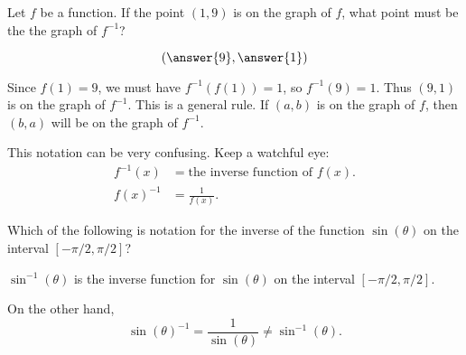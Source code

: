 \documentclass{ximera}
\begin{document}
\begin{question}
  Let $f$ be a function.  If the point $(1,9)$ is on the graph of $f$,
  what point must be the the graph of $f^{-1}$?
  \begin{prompt}
  \[
  \left( \answer{9}, \answer{1} \right)
  \]
  \end{prompt}
  \begin{feedback}
    Since $f(1) = 9$, we must have $f^{-1}(f(1)) = 1$, so $f^{-1}(9) =
    1$.  Thus $(9,1)$ is on the graph of $f^{-1}$.  This is a general
    rule.  If $(a,b)$ is on the graph of $f$, then $(b,a)$ will be on the
    graph of $f^{-1}$.
  \end{feedback}
\end{question}

\begin{warning}
  This notation can be very confusing.  Keep a watchful eye:
  \begin{align*}
    f^{-1}(x) &= \text{the inverse function of $f(x)$.}\\
    f(x)^{-1} &= \text{$\frac{1}{f(x)}$.}
  \end{align*}
\end{warning}
\begin{question}
  Which of the following is notation for the inverse of the function
  $\sin(\theta)$ on the interval $[-\pi/2,\pi/2]$?
  \begin{multipleChoice}
  \end{multipleChoice}
  \begin{feedback}
    $\sin^{-1}(\theta)$ is the inverse function for $\sin(\theta)$ on
    the interval $[-\pi/2,\pi/2]$.

    On the other hand,
    \[
    \sin(\theta)^{-1} = \frac{1}{\sin(\theta)} \ne \sin^{-1}(\theta).
    \]
  \end{feedback}
\end{question}
\end{document}
